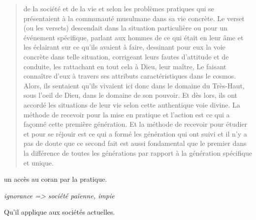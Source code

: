 \begin{quote}
de la société et de la vie et selon les problèmes pratiques qui se
présentaient à la communauté musulmane dans sa vie concrète. Le verset
(ou les versets) descendait dans la situation particulière ou pour un
événement spécifique, parlant aux hommes de ce qui était en leur âme et
les éclairant sur ce qu'ils avaient à faire, dessinant pour eux la voie
concrète dans telle situation, corrigeant leurs fautes d'attitude et de
conduite, les rattachant en tout cela à Dieu, leur maître, Le faisant
connaître d'eux à travers ses attributs caractéristiques dans le cosmos.
Alors, ils sentaient qu'ils vivaient ici donc dans le domaine du
Très-Haut, sous l'oeil de Dieu, dans le domaine de son pouvoir. Et dès
lors, ils ont accordé les situations de leur vie selon cette authentique
voie divine. La méthode de recevoir pour la mise en pratique et l'action
est ce qui a façonné cette première génération. Et la méthode de
recevoir pour étudier et pour se réjouir est ce qui a formé les
génération qui ont suivi et il n'y a pas de doute que ce second fait est
aussi fondamental que le premier dans la différence de toutes les
générations par rapport à la génération spécifique et unique.

\end{quote}

 
\begin{Synthesis}
un accès au coran par la pratique. 
\end{Synthesis}


\begin{Def}[jahiliyya]
\emph{ignorance =\textgreater{} société païenne, impie}
\end{Def}
Qu'il applique aux sociétés actuelles.

